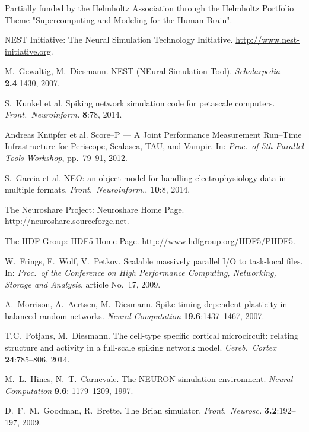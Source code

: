 \documentclass[]{YIC2015}
\begin{document}
Partially funded by the Helmholtz Association through the Helmholtz
Portfolio Theme "Supercomputing and Modeling for the Human Brain".


\begin{thebibliography}{99}

 NEST Initiative: The Neural Simulation
  Technology Initiative. \url{http://www.nest-initiative.org}.

  M.~Gewaltig, M.~Diesmann. NEST (NEural Simulation
  Tool). \textit{Scholarpedia} %
  \textbf{2.4}:1430, 2007.

 S.~Kunkel et al. Spiking network simulation code for
  petascale computers.  \textit{Front.~Neuroinform.} \textbf{8}:78,
  2014.

 Andreas Kn\"upfer et al. Score--P --- A Joint
  Performance Measurement Run--Time Infrastructure for Periscope,
  Scalasca, TAU, and Vampir. In: \textit{Proc.~of 5th Parallel Tools
    Workshop}, pp.~79--91, 2012.

 S.~Garcia et al. NEO: an object model for handling
  electrophysiology data in multiple formats.
  \textit{Front.~Neuroinform.}, \textbf{10}:8, 2014.

 The Neuroshare Project: Neuroshare Home
  Page. \url{http://neuroshare.sourceforge.net}.

 The HDF Group: HDF5 Home
  Page. \url{http://www.hdfgroup.org/HDF5/PHDF5}.

 W.~Frings, F.~Wolf, V.~Petkov. Scalable
  massively parallel I/O to task-local files.  In: \textit{Proc.~of
  the Conference on High Performance Computing, Networking,
    Storage and Analysis}, article No.~17, 2009.

 A.~Morrison, A.~Aertsen,
  M.~Diesmann. Spike-timing-dependent plasticity in balanced random
  networks. \textit{Neural Computation} \textbf{19.6}:1437--1467,
  2007.

 T.C.~Potjans, M.~Diesmann. The cell-type specific
  cortical microcircuit: relating structure and activity in a
  full-scale spiking network model. \textit{Cereb.~Cortex}
  \textbf{24}:785--806, 2014.

 M.~L.~Hines, N.~T.~Carnevale. The NEURON simulation
  environment. \textit{Neural Computation} \textbf{9.6}: 1179--1209,
  1997.

 D.~F.~M.~Goodman, R.~Brette. The Brian
  simulator. \textit{Front.~Neurosc.} \textbf{3.2}:192--197, 2009.

\end{thebibliography}
\end{document}
